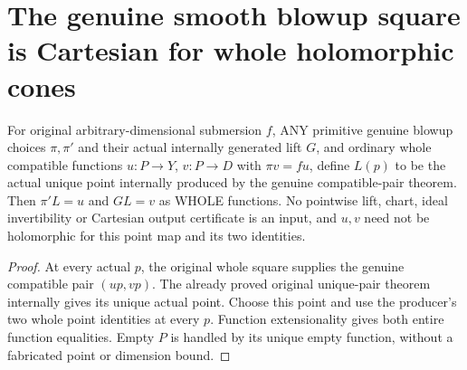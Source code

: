 \section{The genuine smooth blowup square is Cartesian for whole holomorphic cones}

\begin{definition}
\label{hir:submersion-blowup-cartesian-actual-cone-map}
\leanok
{}
For original arbitrary-dimensional submersion $f$, ANY primitive genuine
blowup choices $\pi,\pi'$ and their actual internally generated lift $G$,
and ordinary whole compatible functions $u:P\to Y$, $v:P\to D$ with
$\pi v=fu$, define $L(p)$ to be the actual unique point internally produced
by the genuine compatible-pair theorem. Then $\pi' L=u$ and $G L=v$ as
WHOLE functions. No pointwise lift, chart, ideal invertibility or Cartesian
output certificate is an input, and $u,v$ need not be holomorphic for this
point map and its two identities.
\end{definition}
\begin{proof}
At every actual $p$, the original whole square supplies the genuine
compatible pair $(up,vp)$. The already proved original unique-pair theorem
internally gives its unique actual point. Choose this point and use the
producer's two whole point identities at every $p$. Function extensionality
gives both entire function equalities. Empty $P$ is handled by its unique
empty function, without a fabricated point or dimension bound.
\end{proof}

